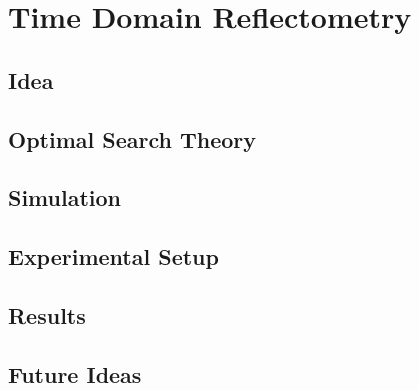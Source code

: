 \documentclass{article}
\begin{document}
\section{Time Domain Reflectometry}

\subsection{Idea}

\subsection{Optimal Search Theory}

\subsection{Simulation}

\subsection{Experimental Setup}

\subsection{Results}

\subsection{Future Ideas}
\end{document}
